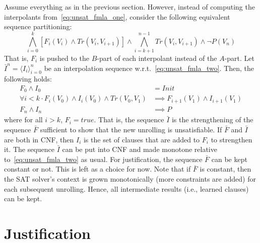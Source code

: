 \documentclass{article}
\newcommand{\Tr}{\mathit{Tr}}
\newcommand{\Init}{\mathit{Init}}
\begin{document}
Assume everything as in the previous section. However, instead of
computing the interpolants from~\eqref{eq:unsat_fmla_one}, consider
the following equivalent sequence partitioning:
\begin{equation}
  \label{eq:unsat_fmla_two}
  \bigwedge_{i=0}^{k}[F_i(V_i) \land \Tr(V_i,V_{i+1})] \land
  \bigwedge_{i=k+1}^{n-1} \Tr(V_i,V_{i+1})\land\neg P(V_n)
\end{equation}
That is, $F_i$ is pushed to the $B$-part of each interpolant instead
of the $A$-part. Let $\bar{I}^n = \langle I_i \rangle_{i=0}^n$ be an
interpolation sequence w.r.t.~\eqref{eq:unsat_fmla_two}. Then, the
following holds:
\begin{align}
  F_0 \land I_0 &= \Init\\
  \forall i < k \cdot F_i(V_0) \land I_i(V_0) \land \Tr(V_0, V_1)
  &\implies F_{i+1}(V_1) \land I_{i+1}(V_1)\\
  F_n \land I_n &\implies P
\end{align}
where for all $i > k$, $F_i = true$. That is, the sequence $\bar{I}$
is the strengthening of the sequence $\bar{F}$ sufficient to show that
the new unrolling is unsatisfiable. If $\bar{F}$ and $\bar{I}$ are
both in CNF, then $I_i$ is the set of clauses that are added to $F_i$
to strengthen it. The sequence $\bar{I}$ can be put into CNF and made
monotone relative to~\eqref{eq:unsat_fmla_two} as usual. For
justification, the sequence $\bar{F}$ can be kept constant or
not. This is left as a choice for now. Note that if $\bar{F}$ is
constant, then the SAT solver's context is grown monotonically (more
constraints are added) for each subsequent unrolling. Hence, all
intermediate results (i.e., learned clauses) can be kept.


\section{Justification}
\end{document}
